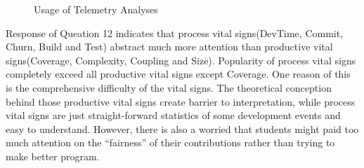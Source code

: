 \documentclass[11pt]{article}
\begin{document}
\begin{figure}[htbp] %
   \centering     
   \vspace{.3in}
   \caption{Usage of Telemetry Analyses}
   \label{fig:analysis-pop}
\end{figure}

Response of Queation 12 indicates that process vital signs(DevTime, Commit, Churn, Build and Test) abstract much more attention than productive vital signs(Coverage, Complexity, Coupling and Size). Popularity of process vital signs completely exceed all productive vital signs except Coverage. One reason of this is the comprehensive difficulty of the vital signs. The theoretical conception behind those productive vital signs create barrier to interpretation, while process vital signs are just straight-forward statistics of some development events and easy to understand. However, there is also a worried that students might paid too much attention on the ``fairness'' of their contributions rather than trying to make better program.
\end{document}
